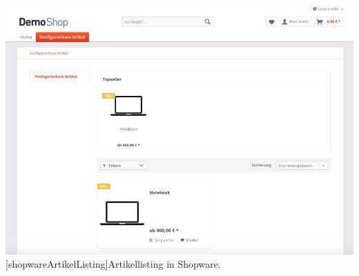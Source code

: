 \begin{appendix}
\vspace{1em}
\begin{minipage}{\linewidth}
	\centering
	\includegraphics[width=1\linewidth]{Abbildungen/shopwareArtikelListing.png}
	[shopwareArtikelListing]{Artikellisting in Shopware.}
	\label{app:shopwareArtikelListing}
\end{minipage}
\vspace{1em}


\end{appendix}